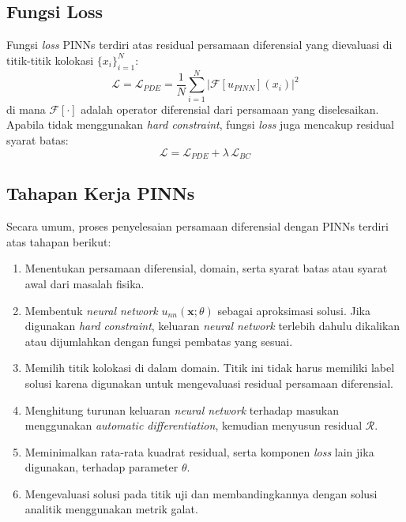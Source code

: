 \documentclass[12pt, letterpaper]{article}
\begin{document}
\subsection{Fungsi Loss}

Fungsi \textit{loss} PINNs terdiri atas residual persamaan diferensial yang
dievaluasi di titik-titik kolokasi $\{x_i\}_{i=1}^{N}$:
\begin{equation}
    \mathcal{L} = \mathcal{L}_{PDE} = \frac{1}{N} \sum_{i=1}^{N} \left| \mathcal{F}[u_{PINN}](x_i) \right|^2
\end{equation}
di mana $\mathcal{F}[\cdot]$ adalah operator diferensial dari persamaan yang
diselesaikan. Apabila tidak menggunakan \textit{hard constraint}, fungsi
\textit{loss} juga mencakup residual syarat batas:
\begin{equation}
    \mathcal{L} = \mathcal{L}_{PDE} + \lambda \, \mathcal{L}_{BC}
\end{equation}

\subsection{Tahapan Kerja PINNs}

Secara umum, proses penyelesaian persamaan diferensial dengan PINNs terdiri
atas tahapan berikut:
\begin{enumerate}
    \item Menentukan persamaan diferensial, domain, serta syarat batas atau
          syarat awal dari masalah fisika.
    \item Membentuk \textit{neural network} $u_{nn}(\mathbf{x};\theta)$ sebagai
          aproksimasi solusi. Jika digunakan \textit{hard constraint}, keluaran
          \textit{neural network} terlebih dahulu dikalikan atau dijumlahkan dengan fungsi
          pembatas yang sesuai.
    \item Memilih titik kolokasi di dalam domain. Titik ini tidak harus
          memiliki label solusi karena digunakan untuk mengevaluasi residual
          persamaan diferensial.
    \item Menghitung turunan keluaran \textit{neural network} terhadap masukan menggunakan
          \textit{automatic differentiation}, kemudian menyusun residual
          $\mathcal{R}$.
    \item Meminimalkan rata-rata kuadrat residual, serta komponen \textit{loss}
          lain jika digunakan, terhadap parameter $\theta$.
    \item Mengevaluasi solusi pada titik uji dan membandingkannya dengan solusi
          analitik menggunakan metrik galat.
\end{enumerate}
\end{document}
